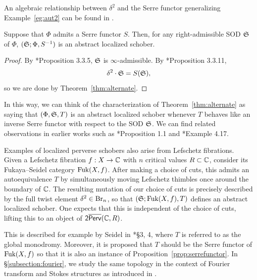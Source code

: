 An algebraic relationship between $\delta^2$ and the Serre functor generalizing Example~\ref{eg:aut2} can be found in \cite{kapranovPerverseSchobersAlgebra2020}.

\begin{prop}\label{prop:serrefunctor}
    Suppose that $\Phi$ admits a Serre functor $S$. Then, for any right-admissible SOD $\mathfrak{S}$ of $\Phi$, $(\mathfrak{S};\Phi,S^{-1})$ is an abstract localized schober.
\end{prop}

\begin{proof}
    By \cite{kapranovPerverseSchobersAlgebra2020}*{Proposition 3.3.5}, $\mathfrak{S}$ is $\infty$-admissible. By \cite{kapranovPerverseSchobersAlgebra2020}*{Proposition 3.3.11},
    \[\delta^2\cdot\mathfrak{S} = S(\mathfrak{S}),\]
    so we are done by Theorem~\ref{thm:alternate}.
\end{proof}

In this way, we can think of the characterization of Theorem~\ref{thm:alternate} as saying that $(\Phi,\mathfrak{S},T)$ is an abstract localized schober whenever $T$ behaves like an inverse Serre functor with respect to the SOD $\mathfrak{S}$. We can find related observations in earlier works such as \cite{addingtonNewDerivedSymmetries2016}*{Proposition 1.1} and \cite{halpern-leistnerAutoequivalencesDerivedCategories2016}*{Example 4.17}.

Examples of localized perverse schobers also arise from Lefschetz fibrations. Given a Lefschetz fibration $f:X\to \mathbb{C}$ with $n$ critical values $R\subset\mathbb{C}$, consider its Fukaya--Seidel category $\operatorname{Fuk}(X,f)$. After making a choice of cuts, this admits an autoequivalence $T$ by simultaneously moving Lefschetz thimbles once around the boundary of $\mathbb{C}$. The resulting mutation of our choice of cuts is precisely described by the full twist element $\delta^2\in\operatorname{Br}_n$, so that $(\mathfrak{S};\operatorname{Fuk}(X,f),T)$ defines an abstract localized schober. One expects that this is independent of the choice of cuts, lifting this to an object of $\mathsf{2}\overline{\mathsf{Perv}}(\mathbb{C},R)$.

This is described for example by Seidel in \cite{seidelSymplecticHomologyHochschild2008}*{\S 3, 4}, where $T$ is referred to as the global monodromy. Moreover, it is proposed that $T$ should be the Serre functor of $\operatorname{Fuk}(X,f)$ so that it is also an instance of Proposition~\ref{prop:serrefunctor}. In \S\ref{subsection:fourier}, we study the same topology in the context of Fourier transform and Stokes structures as introduced in \cite{kapranovPerverseSchobersAlgebra2020}.